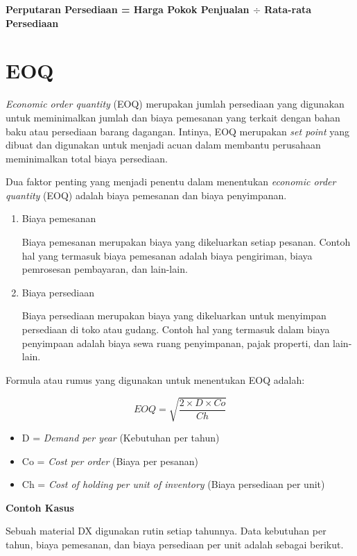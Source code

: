 \textbf{Perputaran Persediaan = Harga Pokok Penjualan $\div$ Rata-rata Persediaan}

\section{EOQ}

\textit{Economic order quantity} (EOQ) merupakan jumlah persediaan yang digunakan untuk meminimalkan jumlah dan biaya pemesanan yang terkait dengan bahan baku atau persediaan barang dagangan. Intinya, EOQ merupakan \textit{set point} yang dibuat dan digunakan untuk menjadi acuan dalam membantu perusahaan meminimalkan total biaya persediaan.

Dua faktor penting yang menjadi penentu dalam menentukan \textit{economic order quantity} (EOQ) adalah biaya pemesanan dan biaya penyimpanan.

\begin{enumerate}
	\item Biaya pemesanan
	
	Biaya pemesanan merupakan biaya yang dikeluarkan setiap pesanan. Contoh hal yang termasuk biaya pemesanan adalah biaya pengiriman, biaya pemrosesan pembayaran, dan lain-lain.

	\item Biaya persediaan
	
	Biaya persediaan merupakan biaya yang dikeluarkan untuk menyimpan persediaan di toko atau gudang. Contoh hal yang termasuk dalam biaya penyimpaan adalah biaya sewa ruang penyimpanan, pajak properti, dan lain-lain.
\end{enumerate}

Formula atau rumus yang digunakan untuk menentukan EOQ adalah:

\[EOQ=\sqrt{\frac{2 \times D \times Co}{Ch}}\]

\begin{itemize}
	\item D = \textit{Demand per year} (Kebutuhan per tahun)
	\item Co = \textit{Cost per order} (Biaya per pesanan)
	\item Ch = \textit{Cost of holding per unit of inventory} (Biaya persediaan per unit)
\end{itemize}

\textbf{Contoh Kasus}

Sebuah material DX digunakan rutin setiap tahunnya. Data kebutuhan per tahun, biaya pemesanan, dan biaya persediaan per unit adalah sebagai berikut.

